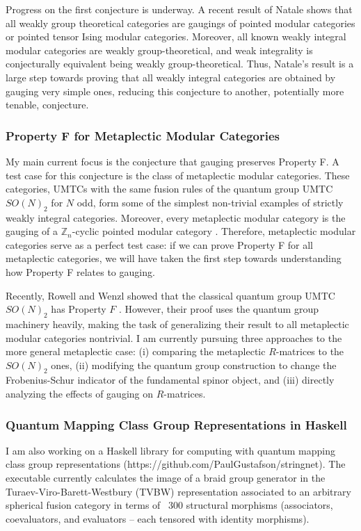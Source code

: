 \documentclass[12pt]{article}
\newcommand{\ZZ}{\mathbb{Z}}
\theoremstyle{definition}
\begin{document}
Progress on the first conjecture is underway. A recent result of Natale \cite{n} shows that all weakly group theoretical categories are gaugings of pointed modular categories or pointed tensor Ising modular categories.  Moreover, all known weakly integral modular categories are weakly group-theoretical, and weak integrality is conjecturally equivalent being weakly group-theoretical.  Thus, Natale's result is a large step towards proving that all weakly integral categories are obtained by gauging very simple ones, reducing this conjecture to another, potentially more tenable, conjecture.

\subsubsection*{Property F for Metaplectic Modular Categories}

My main current focus is the conjecture that gauging preserves Property F. A test case for this conjecture is the class of metaplectic modular categories.  These categories, UMTCs with the same fusion rules of the quantum group UMTC $SO(N)_2$ for $N$ odd,  form some of the simplest non-trivial examples of strictly weakly integral categories.   Moreover, every metaplectic modular category is the gauging of a $\ZZ_n$-cyclic pointed modular category \cite{acrw}.  Therefore, metaplectic modular categories serve as a perfect test case:  if we can prove Property F for all metaplectic categories, we will have taken the first step towards understanding how Property F relates to gauging.  

Recently,  Rowell and Wenzl showed that the classical quantum group UMTC $SO(N)_2$ has Property $F$ \cite{rw}.  However, their proof uses the quantum group machinery heavily, making the task of generalizing their result to all metaplectic modular categories nontrivial.  I am currently pursuing three approaches  to the more general metaplectic case: (i) comparing the metaplectic $R$-matrices to the $SO(N)_2$ ones, (ii) modifying the quantum group construction to change the Frobenius-Schur indicator of the fundamental spinor object, and (iii) directly analyzing the effects of gauging on $R$-matrices.

\subsubsection*{Quantum Mapping Class Group Representations in Haskell}
I am also working on a Haskell library for computing with quantum mapping class group representations  (https://github.com/PaulGustafson/stringnet).  The executable currently calculates the image of a braid group generator in the Turaev-Viro-Barett-Westbury (TVBW) representation associated to an arbitrary spherical fusion category in terms of ~300 structural morphisms (associators, coevaluators, and evaluators -- each tensored with identity morphisms).
\end{document}
